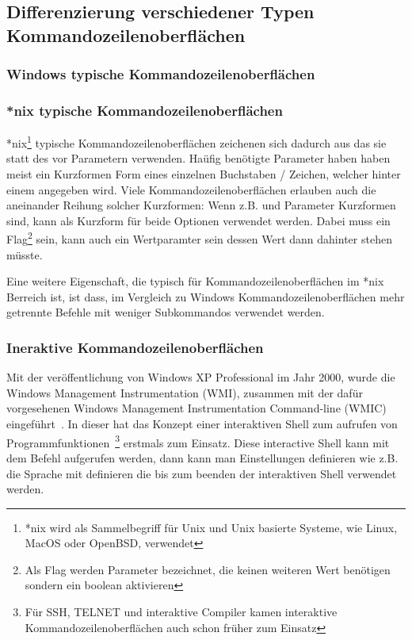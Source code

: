  \subsection{Differenzierung verschiedener Typen Kommandozeilenoberflächen}\label{subsec:DifferentCLITypes}
 \subsubsection{Windows typische Kommandozeilenoberflächen}
 \subsubsection{*nix typische Kommandozeilenoberflächen}
 *nix\footnote{*nix wird als Sammelbegriff für Unix und Unix basierte Systeme, wie Linux, MacOS oder OpenBSD, verwendet} typische Kommandozeilenoberflächen
 zeichenen sich dadurch aus das sie statt des \inlinecode{/} vor Parametern \inlinecode{--} verwenden.
 Haüfig benötigte Parameter haben haben meist ein Kurzformen Form eines einzelnen Buchstaben / Zeichen, welcher hinter einem \inlinecode{-} angegeben wird.
 Viele Kommandozeilenoberflächen erlauben auch die aneinander Reihung solcher Kurzformen: Wenn z.B.  und  Parameter Kurzformen sind, kann  als Kurzform für beide Optionen verwendet werden.
 Dabei muss  ein Flag\footnote{Als Flag werden Parameter bezeichnet, die keinen weiteren Wert benötigen sondern ein boolean aktivieren} sein,
  kann auch ein Wertparamter sein dessen Wert dann dahinter stehen müsste.
 
 Eine weitere Eigenschaft, die typisch für Kommandozeilenoberflächen im *nix Berreich ist, ist dass,
 im Vergleich zu Windows Kommandozeilenoberflächen mehr getrennte Befehle mit weniger Subkommandos verwendet werden.
 \subsubsection{Ineraktive Kommandozeilenoberflächen}
 Mit der veröffentlichung von Windows XP Professional im Jahr 2000, wurde die Windows Management Instrumentation (WMI),
 zusammen mit der dafür vorgesehenen Windows Management Instrumentation Command-line (WMIC) eingeführt~\cite{WMIProgrammingBlogPost}.
 In dieser hat das Konzept einer interaktiven Shell zum aufrufen von
 Programmfunktionen~\footnote{Für SSH, TELNET und interaktive Compiler kamen interaktive Kommandozeilenoberflächen auch schon früher zum Einsatz} erstmals zum Einsatz.
 Diese interactive Shell kann mit dem  Befehl aufgerufen werden, dann kann man Einstellungen definieren wie
 z.B. die Sprache mit  definieren die bis zum beenden der interaktiven Shell verwendet werden.
 
